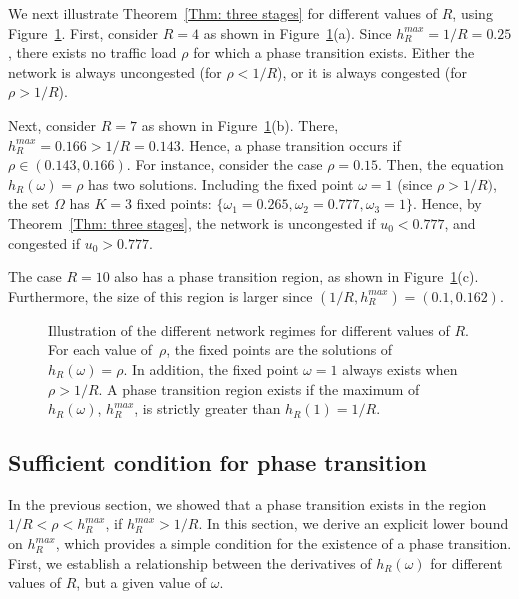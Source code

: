 \documentclass{IEEEtran}
\begin{document}
We next illustrate Theorem~\ref{Thm: three stages} for different values of $R$, using  Figure~\ref{number_of_fixed_points}.
First, consider $R = 4$ as shown in Figure~\ref{number_of_fixed_points}(a). Since $h^{max}_R = 1/R=0.25$, there exists no traffic load $\rho$ for
which a phase transition exists. Either the network is always uncongested (for $\rho < 1/R$), or it is always congested (for $\rho > 1/R$).

Next, consider $R = 7$ as shown in Figure~\ref{number_of_fixed_points}(b). There, $h^{max}_R = 0.166 > 1/R = 0.143$. Hence, a phase transition
occurs if $\rho \in (0.143, 0.166)$. For instance, consider the case $\rho = 0.15$. Then, the equation $h_R(\omega)=\rho$ has two solutions.
Including the fixed point $\omega=1$ (since $\rho > 1/R)$, the set $\Omega$ has $K=3$  fixed points: $\{ \omega_1=0.265, \omega_2=0.777,
\omega_3=1\}$. Hence, by Theorem~\ref{Thm: three stages}, the network is uncongested if $u_0 < 0.777$, and congested if $u_0 > 0.777$.

The case $R=10$ also has a phase transition region, as shown in Figure~\ref{number_of_fixed_points}(c). Furthermore, the size of this region is
larger since $(1/R, h^{max}_R) = (0.1, 0.162)$.





\begin{figure}[!t]
\centering
{}
\caption{Illustration of the different network regimes for different values of $R$. For each value of~$\rho$, the fixed points are the solutions of
$h_R(\omega)= \rho$. In addition, the fixed point $\omega =1$ always exists when $\rho > 1/R$. A phase transition region exists if the maximum of
$h_R(\omega)$, $h_R^{max}$, is strictly greater than $h_R(1) = 1/R$.}
\label{number_of_fixed_points}
\end{figure}





\subsection{Sufficient condition for phase transition}
\label{The sufficient condition for phase transition}
In the previous section, we showed that a phase transition exists in the region $1/R < \rho < h^{max}_R$, if $h^{max}_R > 1/R$. In this section, we
derive an explicit lower bound on $h^{max}_R$, which provides a simple  condition for the existence of a phase transition. First, we establish a
relationship between the derivatives of $h_{R}(\omega)$ for different values of $R$, but a given value of $\omega$.
\end{document}
